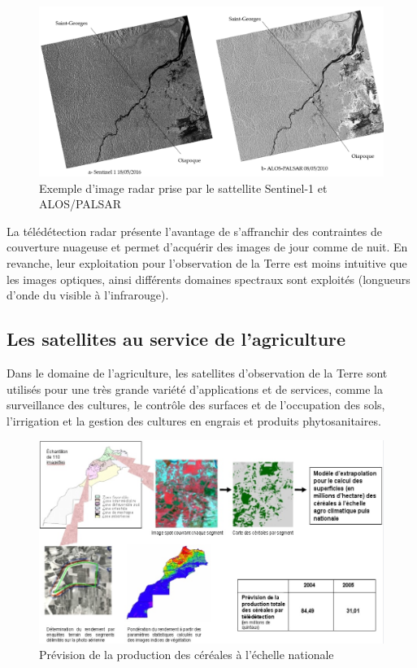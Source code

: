\documentclass[12pt, openany]{report}
\begin{document}
\begin{figure}[H]
\centering
\includegraphics[scale=0.3]{image_radar.png}
\caption{Exemple d'image radar prise par le sattellite Sentinel-1 et ALOS/PALSAR}
\end{figure}

\par
La télédétection radar présente l’avantage de s’affranchir des contraintes de couverture nuageuse et permet d'acquérir des images de jour comme de nuit. En revanche, leur exploitation pour l’observation de la Terre est moins intuitive que les images optiques, ainsi différents domaines spectraux sont exploités (longueurs d’onde du visible à l’infrarouge).\cite{ref4}



\subsection{Les satellites au service de l'agriculture}

Dans le domaine de l'agriculture, les satellites d'observation de la Terre sont utilisés pour une très grande variété d’applications et de services, comme la surveillance des cultures, le contrôle des surfaces et de l'occupation des sols, l'irrigation et la gestion des cultures en engrais et produits phytosanitaires.  \cite{satt}


\begin{figure}[H]
\centering
\includegraphics[scale=0.7]{prev.jpg}
\caption{Prévision de la production des céréales à l'échelle nationale}
\end{figure}
\end{document}

